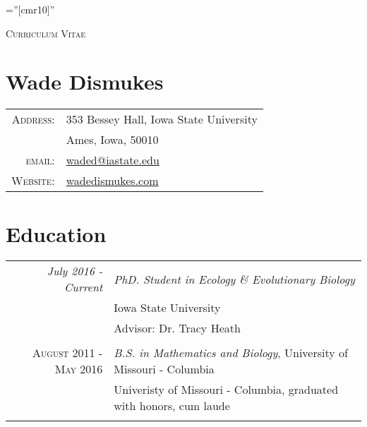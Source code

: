 \documentclass[12pt]{article}
\begin{document}

\pagestyle{empty} %

\font\fb=''[cmr10]'' %

\par{\centering
		{\Large \textsc{Curriculum Vitae}
	}\bigskip\par}

\section{\LARGE Wade Dismukes}

\begin{tabular}{rl}
    \textsc{Address:}   & 353 Bessey Hall, Iowa State University \\
                        & Ames, Iowa, 50010 \\
    \textsc{email:}     & \href{mailto:waded@iastate.edu}{waded@iastate.edu}\\
    \textsc{Website:}   & \href{https://www.wadedismukes.com/} {wadedismukes.com}
\end{tabular}

\section{Education}
\begin{tabular}{r|p{11cm}}
 \emph{July 2016 - Current} & \emph{PhD. Student in Ecology \& Evolutionary Biology} \\
 & Iowa State University \\
 & Advisor: Dr. Tracy Heath \\\multicolumn{2}{c}{} \\\textsc{August 2011 - May 2016} &\emph{B.S. in Mathematics and Biology}, University of Missouri - Columbia \\&\footnotesize{Univeristy of Missouri - Columbia, graduated with honors, cum laude}\\\multicolumn{2}{c}{} \\
\end{tabular}
\end{document}
